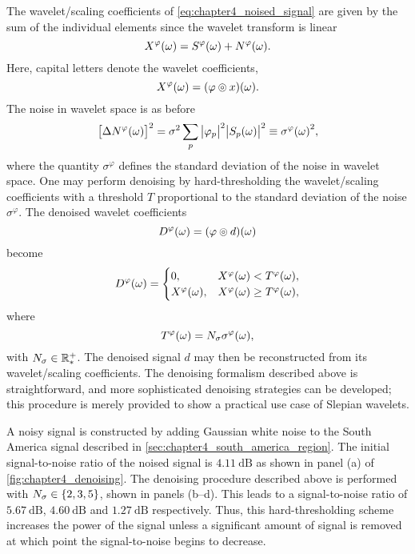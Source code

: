 The wavelet/scaling coefficients of \cref{eq:chapter4_noised_signal} are given by the sum of the individual elements since the wavelet transform is linear
%
\begin{equation}
	X^{\varphi}(\omega)
	= S^{\varphi}(\omega) + N^{\varphi}(\omega).
\end{equation}
%
Here, capital letters denote the wavelet coefficients, \ie{}
%
\begin{equation}\label{eq:chapter4_capital_letters}
	X^{\varphi}(\omega) = (\varphi \circledcirc{} x)(\omega).
\end{equation}
%
The noise in wavelet space is as before
%
\begin{equation}
	{\big[\Delta N^{\varphi}(\omega)\big]}^{2}
	= \sigma^{2} \displaystyle\sum\limits_{p} \big\lvert{\varphi}_{p}\big\rvert^{2} \big\lvert{S}_{p}(\omega)\big\rvert^{2}
	\equiv {\sigma^{\varphi}(\omega)}^{2},
\end{equation}
%
where the quantity \(\sigma^{\varphi}\) defines the standard deviation of the noise in wavelet space.
One may perform denoising by hard-thresholding the wavelet/scaling coefficients with a threshold \(T\) proportional to the standard deviation of the noise \(\sigma^{\varphi}\).
The denoised wavelet coefficients
%
\begin{equation}\label{eq:chapter4_denoised_wavelet_coefficients}
	D^{\varphi}(\omega) = (\varphi \circledcirc{} d)(\omega)
\end{equation}
%
become
%
\begin{equation}
	D^{\varphi}(\omega) =
	\begin{cases}
		0,
		 & X^{\varphi}(\omega) < T^{\varphi}(\omega),    \\
		X^{\varphi}(\omega),
		 & X^{\varphi}(\omega) \geq T^{\varphi}(\omega),
	\end{cases}
\end{equation}
%
where
%
\begin{equation}
	T^{\varphi}(\omega)
	= N_{\sigma}\sigma^{\varphi}(\omega),
\end{equation}
%
with \(N_{\sigma} \in \mathbb{R}_{\ast}^{+}{}\).
The denoised signal \(d\) may then be reconstructed from its wavelet/scaling coefficients.
The denoising formalism described above is straightforward, and more sophisticated denoising strategies can be developed; this procedure is merely provided to show a practical use case of Slepian wavelets.

A noisy signal is constructed by adding Gaussian white noise to the South America signal described in \cref{sec:chapter4_south_america_region}.
The initial signal-to-noise ratio of the noised signal is \(\SI{4.11}{\dB}\) as shown in panel (a) of \cref{fig:chapter4_denoising}.
The denoising procedure described above is performed with \(N_{\sigma} \in \{2, 3, 5\}\), shown in panels (b--d). %
This leads to a signal-to-noise ratio of \(\SI{5.67}{\dB}\), \(\SI{4.60}{\dB}\) and \(\SI{1.27}{\dB}\) respectively.
Thus, this hard-thresholding scheme increases the power of the signal unless a significant amount of signal is removed at which point the signal-to-noise begins to decrease.

